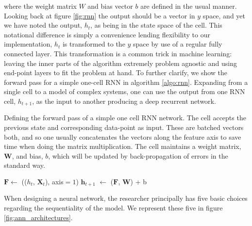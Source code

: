 \noindent where the weight matrix $W$ and bias vector $b$ are defined in the usual manner. Looking back at figure \ref{fig:rnn} the output should be a vector in $y$ space, and yet we have noted the output, $h_t$, as being in the state space of the cell. This notational difference is simply a convenience lending flexibility to our implementation, $h_t$ is transformed to the $y$ space by use of a regular fully connected layer. This transformation is a common trick in machine learning: leaving the inner parts of the algorithm extremely problem agnostic and using end-point layers to fit the problem at hand. To further clarify, we show the forward pass for a simple one-cell RNN in algorithm \ref{algo:rnn}. Expanding from a single cell to a model of complex systems, one can use the output from one RNN cell, $h_{t+1}$, as the input to another producing a deep recurrent network. 

\begin{algorithm}[H]
\SetAlgoLined
\caption{Defining the forward pass of a simple one cell RNN network. The cell accepts the previous state and corresponding data-point as input. These are batched vectors both, and so one usually concatenates the vectors along the feature axis to save time when doing the matrix multiplication. The cell maintains a weight matrix, $\mathbf{W}$, and bias, $b$, which will be updated by back-propagation of errors in the standard way.}\label{algo:rnn}
$\mathbf{F} \gets$ (($h_t$, $\mathbf{X}_t$), axis$=1$)\;
$\mathbf{h}_{t+1}$ $\gets$ ($\mathbf{F}$, $\mathbf{W}$) + b\;
\end{algorithm}

\noindent When designing a neural network, the researcher principally has five basic choices regarding the sequentiality of the model. We represent these five in figure \ref{fig:ann_architectures}.

